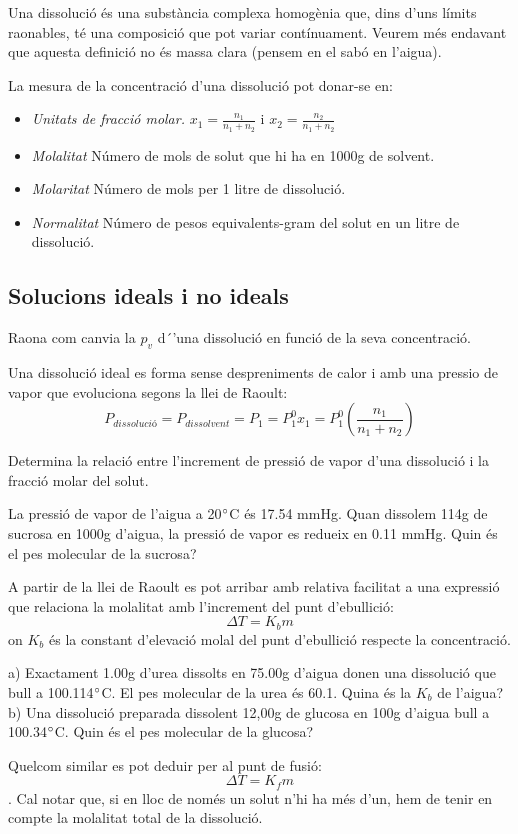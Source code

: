 Una dissolució és una substància complexa homogènia que, dins d'uns límits raonables, té una composició que pot variar contínuament.
Veurem més endavant que aquesta definició no és massa clara (pensem en el sabó en l'aigua).

La mesura de la concentració d'una dissolució pot donar-se en:
\begin{itemize}
\item \emph{Unitats de fracció molar.} $x_1=\frac{n_1}{n_1+n_2}$ i $x_2=\frac{n_2}{n_1+n_2}$
\item \emph{Molalitat} Número de mols de solut que hi ha en 1000g de solvent.
\item \emph{Molaritat} Número de mols per 1 litre de dissolució.
\item \emph{Normalitat} Número de pesos equivalents-gram del solut en un litre de dissolució.
\end{itemize}
\subsection{Solucions ideals i no ideals}

\begin{exr}
Raona com canvia la $p_v$ d´'una dissolució en funció de la seva concentració.
\end{exr}
Una dissolució ideal es forma sense despreniments de calor i amb una pressio de vapor que evoluciona segons la llei de Raoult:
\[
P_{dissolució}=P_{dissolvent}=P_1=P_1^0x_1 = P_1^0 \left(\frac{n_1}{n_1+n_2}\right)
\]
\begin{exr}
Determina la relació entre l'increment de pressió de vapor d'una dissolució i la fracció molar del solut.
\end{exr}
\begin{exr}
La pressió de vapor de l'aigua a 20$\degree$C és 17.54 mmHg. Quan dissolem 114g de sucrosa en 1000g d'aigua, la pressió de vapor es redueix en 0.11 mmHg. Quin és el pes molecular de la sucrosa?
\end{exr}

A partir de la llei de Raoult es pot arribar amb relativa facilitat a una expressió que relaciona la molalitat amb l'increment del punt d'ebullició:
\[
\Delta T=K_b m
\]
on $K_b$ és la constant d'elevació molal del punt d'ebullició respecte la concentració.
\begin{exr}
a) Exactament 1.00g d'urea dissolts en 75.00g d'aigua donen una dissolució que bull a 100.114$\degree$C. El pes molecular de la urea és 60.1. Quina és la $K_b$ de l'aigua?
b) Una dissolució preparada dissolent 12,00g de glucosa en 100g d'aigua bull a 100.34$\degree$C. Quin és el pes molecular de la glucosa?
\end{exr}
Quelcom similar es pot deduir per al punt de fusió: \[\Delta T = K_f m\]. Cal notar que, si en lloc de només un solut n'hi ha més d'un, hem de tenir en compte la molalitat total de la dissolució.

